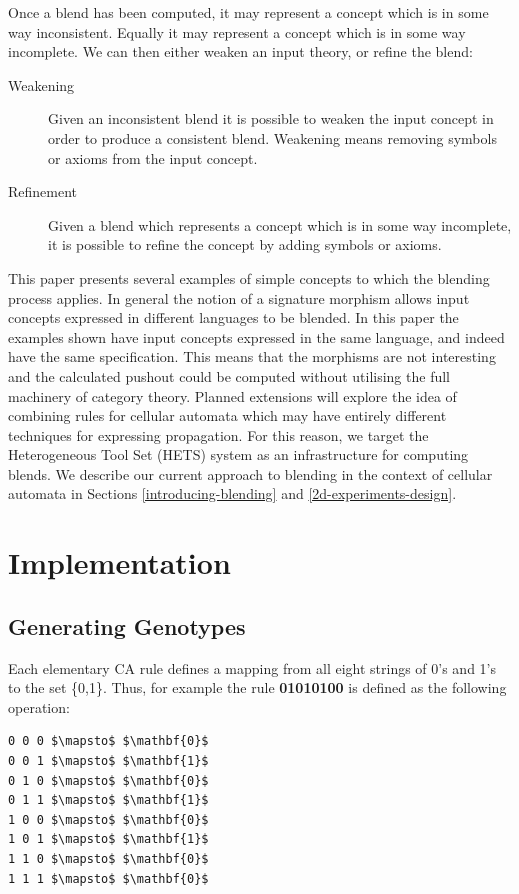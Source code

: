 \documentclass{AISB2008}
\begin{document}
Once a blend has been computed, it may represent a concept which is in
some way inconsistent. Equally it may represent a concept which is in
some way incomplete. We can then either weaken an input theory, or
refine the blend:
\begin{description}
\item[Weakening] Given an inconsistent blend it is possible to weaken the input concept in order to produce a consistent blend. Weakening means removing symbols or axioms from the input concept.
\item[Refinement] Given a blend which represents a concept which is in some way incomplete, it is possible to refine the concept by adding symbols or axioms.
\end{description}

This paper presents several examples of simple concepts to which the
blending process applies. In general the notion of a signature
morphism allows input concepts expressed in different languages to be
blended. In this paper the examples shown have input concepts
expressed in the same language, and indeed have the same
specification. This means that the morphisms are not interesting and
the calculated pushout could be computed without utilising the full
machinery of category theory.  Planned extensions will explore the
idea of combining rules for cellular automata which may have entirely
different techniques for expressing propagation.  For this reason, we
target the Heterogeneous Tool Set (HETS) system
\cite{mossakowski2007heterogeneous} as an infrastructure for computing
blends.  We describe our current approach to blending in the context
of cellular automata in Sections \ref{introducing-blending} and
\ref{2d-experiments-design}.


\section{Implementation}

\subsection{Generating Genotypes} \label{sec:geno}

Each elementary CA rule defines a mapping from all eight strings of
0's and 1's to the set \{0,1\}.  Thus, for example the rule \textbf{01010100}
is defined as the following operation:
\begin{lstlisting}[mathescape]
0 0 0 $\mapsto$ $\mathbf{0}$
0 0 1 $\mapsto$ $\mathbf{1}$
0 1 0 $\mapsto$ $\mathbf{0}$
0 1 1 $\mapsto$ $\mathbf{1}$
1 0 0 $\mapsto$ $\mathbf{0}$
1 0 1 $\mapsto$ $\mathbf{1}$
1 1 0 $\mapsto$ $\mathbf{0}$
1 1 1 $\mapsto$ $\mathbf{0}$
\end{lstlisting}
\end{document}
